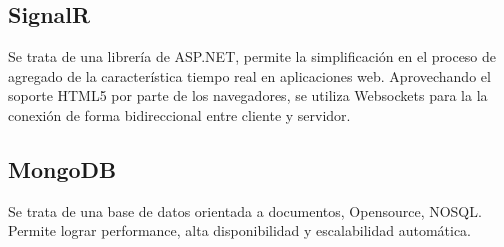 \documentclass[journal]{IEEEtran}
\begin{document}
\subsection{SignalR}
Se trata de una librería de ASP.NET, permite la simplificación en el proceso de agregado de la característica tiempo real en aplicaciones web.
Aprovechando el soporte HTML5 por parte de los navegadores, se utiliza Websockets para la la conexión de forma bidireccional entre cliente y servidor. \cite{url:signalr}

\subsection{MongoDB}
Se trata de una base de datos orientada a documentos, Opensource, NOSQL. Permite lograr performance, alta disponibilidad y escalabilidad automática.\cite{url:mongo}
\end{document}
